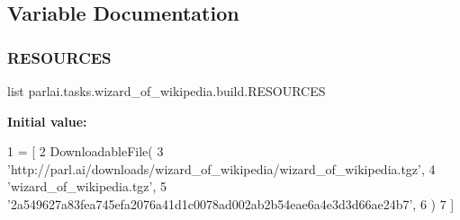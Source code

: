 \subsection{Variable Documentation}
\mbox{\label{namespaceparlai_1_1tasks_1_1wizard__of__wikipedia_1_1build_a4c63e3a1540ac5cec10e79a90e2975a8}} 
\subsubsection{\texorpdfstring{R\+E\+S\+O\+U\+R\+C\+ES}{RESOURCES}}
{\footnotesize\ttfamily list parlai.\+tasks.\+wizard\+\_\+of\+\_\+wikipedia.\+build.\+R\+E\+S\+O\+U\+R\+C\+ES}

{\bfseries Initial value\+:}
\begin{DoxyCode}
1 =  [
2     DownloadableFile(
3         \textcolor{stringliteral}{'http://parl.ai/downloads/wizard\_of\_wikipedia/wizard\_of\_wikipedia.tgz'},
4         \textcolor{stringliteral}{'wizard\_of\_wikipedia.tgz'},
5         \textcolor{stringliteral}{'2a549627a83fea745efa2076a41d1c0078ad002ab2b54eae6a4e3d3d66ae24b7'},
6     )
7 ]
\end{DoxyCode}
